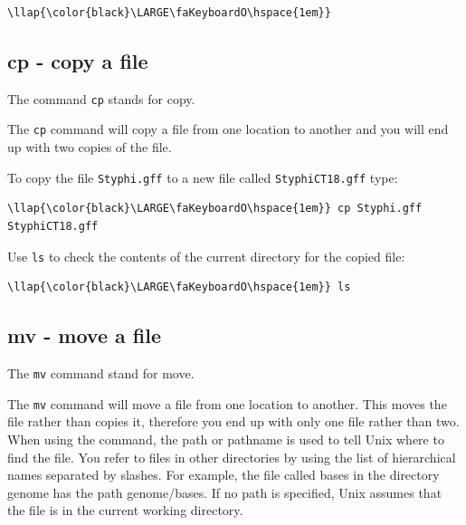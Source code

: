 \documentclass[11pt]{article}
\begin{document}
\begin{terminalinput}
\begin{Verbatim}[commandchars=\\\{\}]
\llap{\color{black}\LARGE\faKeyboardO\hspace{1em}}
\end{Verbatim}
\end{terminalinput}

    \hypertarget{cp---copy-a-file}{%
\subsection{cp - copy a file}\label{cp---copy-a-file}}

The command \texttt{cp} stands for copy.

The \texttt{cp} command will copy a file from one location to another
and you will end up with two copies of the file.

    To copy the file \texttt{Styphi.gff} to a new file called
\texttt{StyphiCT18.gff} type:

\begin{terminalinput}
\begin{Verbatim}[commandchars=\\\{\}]
\llap{\color{black}\LARGE\faKeyboardO\hspace{1em}} cp Styphi.gff StyphiCT18.gff
\end{Verbatim}
\end{terminalinput}

    Use \texttt{ls} to check the contents of the current directory for the
copied file:

\begin{terminalinput}
\begin{Verbatim}[commandchars=\\\{\}]
\llap{\color{black}\LARGE\faKeyboardO\hspace{1em}} ls
\end{Verbatim}
\end{terminalinput}

    \hypertarget{mv---move-a-file}{%
\subsection{mv - move a file}\label{mv---move-a-file}}

The \texttt{mv} command stand for move.

The \texttt{mv} command will move a file from one location to another.
This moves the file rather than copies it, therefore you end up with
only one file rather than two. When using the command, the path or
pathname is used to tell Unix where to find the file. You refer to files
in other directories by using the list of hierarchical names separated
by slashes. For example, the file called bases in the directory genome
has the path genome/bases. If no path is specified, Unix assumes that
the file is in the current working directory.
\end{document}
